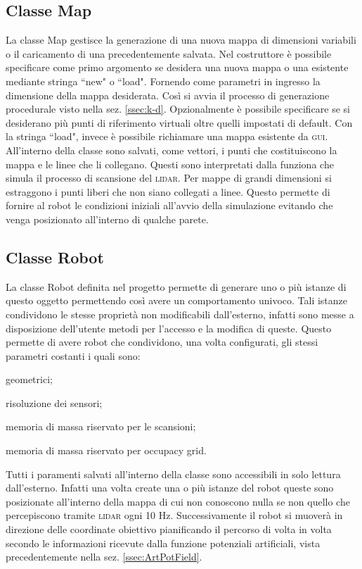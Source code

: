 \subsection{Classe Map}
\label{ssec:ClassMap}
La classe Map gestisce la generazione di una nuova mappa di dimensioni variabili
o il caricamento di una precedentemente salvata. Nel costruttore è possibile
specificare come primo argomento se desidera una nuova mappa o una esistente
mediante stringa ``new" o ``load".
Fornendo come parametri in ingresso la dimensione della mappa desiderata.
Così si avvia il processo di generazione procedurale visto
nella sez. \ref{ssec:k-d}. Opzionalmente è possibile specificare se si
desiderano più punti di riferimento virtuali oltre quelli impostati di default.
Con la stringa ``load", invece è possibile richiamare una mappa esistente da
\textsc{gui}.
All'interno della classe sono salvati, come vettori, i punti che costituiscono
la mappa e le linee che li collegano. Questi sono interpretati dalla funziona
che simula il processo di scansione del \textsc{lidar}.
Per mappe di grandi dimensioni si estraggono i punti liberi che non siano
collegati a linee. Questo permette di fornire al robot le condizioni iniziali
all'avvio della simulazione evitando che venga posizionato all'interno di
qualche parete.

\subsection{Classe Robot}
\label{ssec:ClassRobot}
La classe Robot definita nel progetto permette di generare uno o più istanze di
questo oggetto permettendo così avere un comportamento univoco.
Tali istanze condividono le stesse proprietà non modificabili dall'esterno,
infatti sono messe a disposizione dell'utente metodi per l'accesso e la
modifica di queste.
Questo permette di avere robot che condividono, una volta configurati, gli
stessi parametri costanti i quali sono:
\begin{enumerate*}[label={\alph*)},font={\bfseries}]
	\item geometrici;
	\item risoluzione dei sensori;
	\item memoria di massa riservato per le scansioni;
	\item memoria di massa riservato per occupacy grid.
\end{enumerate*}
Tutti i paramenti salvati all'interno della classe sono accessibili in solo
lettura dall'esterno.
Infatti una volta create una o più istanze del robot queste sono posizionate
all'interno della mappa di cui non conoscono nulla se non quello che
percepiscono tramite \textsc{lidar} ogni 10 \si{\hertz}. Successivamente il
robot si muoverà in direzione delle coordinate obiettivo pianificando il
percorso di volta in volta secondo le informazioni ricevute dalla funzione
potenziali artificiali, vista precedentemente nella sez. \ref{ssec:ArtPotField}.

